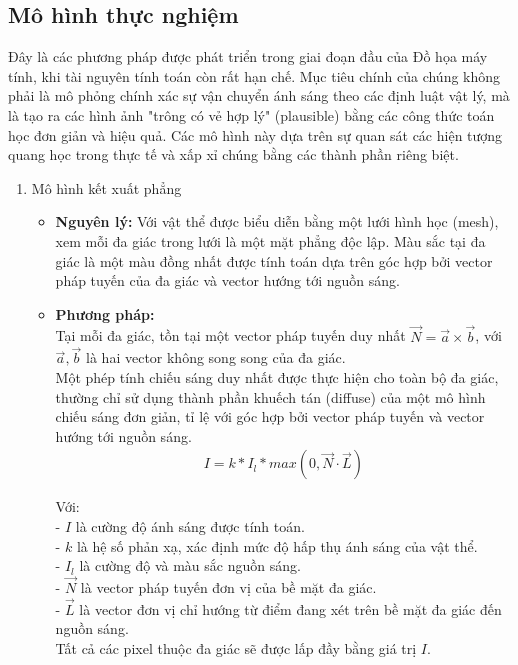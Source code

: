 \subsection{Mô hình thực nghiệm}
Đây là các phương pháp được phát triển trong giai đoạn đầu của Đồ họa máy tính, khi tài nguyên tính toán còn rất hạn chế. Mục tiêu chính của chúng không phải là mô phỏng chính xác sự vận chuyển ánh sáng theo các định luật vật lý, mà là tạo ra các hình ảnh "trông có vẻ hợp lý" (plausible) bằng các công thức toán học đơn giản và hiệu quả. Các mô hình này dựa trên sự quan sát các hiện tượng quang học trong thực tế và xấp xỉ chúng bằng các thành phần riêng biệt.
\begin{enumerate}
	\item Mô hình kết xuất phẳng
	\begin{itemize}
		\item \textbf{Nguyên lý:} Với vật thể được biểu diễn bằng một lưới hình học (mesh), xem mỗi đa giác trong lưới là một mặt phẳng độc lập. Màu sắc tại đa giác là một màu đồng nhất được tính toán dựa trên góc hợp bởi vector pháp tuyến của đa giác và vector hướng tới nguồn sáng\cite{principles_1990}.
		
		\item \textbf{Phương pháp:}\\
		Tại mỗi đa giác, tồn tại một vector pháp tuyến duy nhất $\vec{N} = \vec{a} \times \vec{b}$, với $\vec{a}, \vec{b}$ là hai vector không song song của đa giác.\\
		Một phép tính chiếu sáng duy nhất được thực hiện cho toàn bộ đa giác, thường chỉ sử dụng thành phần khuếch tán (diffuse) của một mô hình chiếu sáng đơn giản, tỉ lệ với góc hợp bởi vector pháp tuyến và vector hướng tới nguồn sáng.
		\begin{gather*}
			I = k * I_l * max(0, \vec{N} \cdot \vec{L})
		\end{gather*}
		
		Với:\\
		- $I$ là cường độ ánh sáng được tính toán.\\
		- $k$ là hệ số phản xạ, xác định mức độ hấp thụ ánh sáng của vật thể.\\
		- $I_l$ là cường độ và màu sắc nguồn sáng.\\
		- $\vec{N}$ là vector pháp tuyến đơn vị của bề mặt đa giác.\\
		- $\vec{L}$ là vector đơn vị chỉ hướng từ điểm đang xét trên bề mặt đa giác đến nguồn sáng.\\
		Tất cả các pixel thuộc đa giác sẽ được lấp đầy bằng giá trị $I$.
		

\end{itemize}
\end{enumerate}
